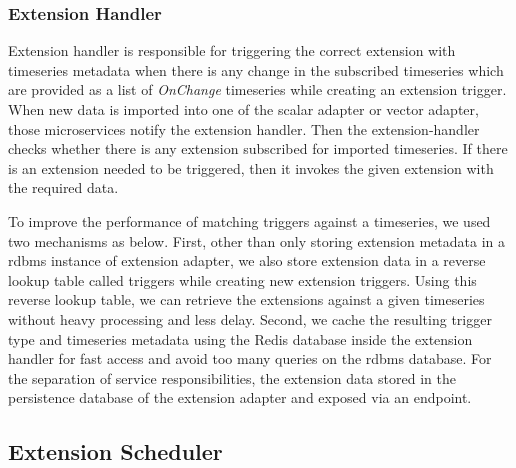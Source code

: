 \subsubsection{Extension Handler}

Extension handler is responsible for triggering the correct extension with timeseries metadata when there is any change in the subscribed timeseries which are provided as a list of \emph{OnChange} timeseries while creating an extension trigger.
When new data is imported into one of the scalar adapter or vector adapter, those microservices notify the extension handler. Then the extension-handler checks whether there is any extension subscribed for imported timeseries. If there is an extension needed to be triggered, then it invokes the given extension with the required data.

To improve the performance of matching triggers against a timeseries, we used two mechanisms as below. First, other than only storing extension metadata in a \acrshort{rdbms} instance of extension adapter, we also store extension data in a reverse lookup table called triggers while creating new extension triggers. Using this reverse lookup table, we can retrieve the extensions against a given timeseries without heavy processing and less delay. Second, we cache the resulting trigger type and timeseries metadata using the Redis database inside the extension handler for fast access and avoid too many queries on the \acrshort{rdbms} database. For the separation of service responsibilities, the extension data stored in the persistence database of the extension adapter and exposed via an endpoint.

\subsection{Extension Scheduler}

